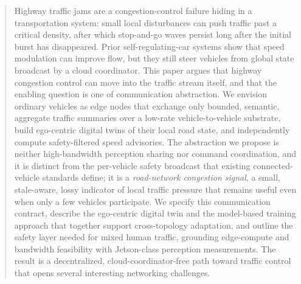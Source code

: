 \begin{abstract}
Highway traffic jams are a congestion-control failure hiding in a transportation system: small local disturbances can push traffic past a critical density, after which stop-and-go waves persist long after the initial burst has disappeared. Prior self-regulating-car systems show that speed modulation can improve flow, but they still steer vehicles from global state broadcast by a cloud coordinator. This paper argues that highway congestion control can move into the traffic stream itself, and that the enabling question is one of communication abstraction. We envision ordinary vehicles as edge nodes that exchange only bounded, semantic, aggregate traffic summaries over a low-rate vehicle-to-vehicle substrate, build ego-centric digital twins of their local road state, and independently compute safety-filtered speed advisories.
The abstraction we propose is neither high-bandwidth perception sharing nor command coordination, and it is distinct from the per-vehicle safety broadcast that existing connected-vehicle standards define; it is a \emph{road-network congestion signal}, a small, stale-aware, lossy indicator of local traffic pressure that remains useful even when only a few vehicles participate.
We specify this communication contract, describe the ego-centric digital twin and the model-based training approach that together support cross-topology adaptation, and outline the safety layer needed for mixed human traffic, grounding edge-compute and bandwidth feasibility with Jetson-class perception measurements. The result is a decentralized, cloud-coordinator-free path toward traffic control that opens several interesting networking challenges.
\end{abstract}
